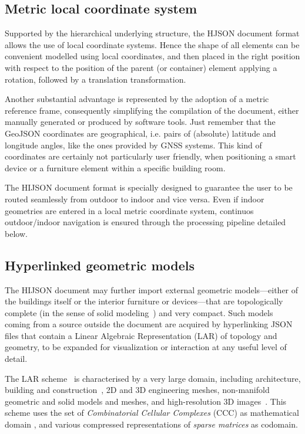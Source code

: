 \subsection{Metric local coordinate system}\label{metric-local-coordinate-system}

Supported by the hierarchical underlying structure, the HJSON document format allows 
the use of local coordinate systems. Hence the shape of all elements can 
be convenient modelled using local coordinates, and then placed in the right position 
with respect to the position of the parent (or container) element applying a rotation, followed by a
translation transformation.

Another substantial advantage is represented by the adoption of a metric
reference frame,  consequently simplifying the compilation of the document,
either manually generated or produced by software tools. Just remember that
the GeoJSON coordinates are geographical, i.e. pairs of (absolute) latitude
and longitude angles, like the ones provided by GNSS systems. This kind of
coordinates  are certainly not particularly user friendly, when positioning a
smart device or a furniture element within a specific building room.

The HIJSON document format is specially designed to guarantee the user to be routed seamlessly 
from outdoor to indoor and vice versa. Even if indoor geometries are entered in a local metric 
coordinate system, continuos outdoor/indoor navigation is ensured through the processing pipeline
detailed below.

\subsection{Hyperlinked geometric models}\label{optional-lar}

The HIJSON document may further import external geometric models---either of the buildings itself or the interior furniture or devices---that are topologically complete (in the sense of solid modeling~\cite{Requicha:1980:RRS:356827.356833}) and very compact. 
Such models coming from a source outside the document are acquired by hyperlinking JSON files that contain a Linear Algebraic Representation (LAR) of topology and geometry, to be expanded for visualization or interaction at any useful level of detail. 

The LAR scheme~\cite{Dicarlo:2014:TNL:2543138.2543294} is characterised by a very large domain, including architecture, building and construction~\cite{paoluzziMS:2014}, 2D and 3D engineering meshes, non-manifold geometric and solid models and meshes, and high-resolution 3D images~\cite{cadanda:2015}. This scheme uses the set of \emph{Combinatorial Cellular Complexes} (CCC) as mathematical domain
\cite{Basak:2010}, and various compressed representations of \emph{sparse matrices} \cite{gemmexp} as codomain. 

